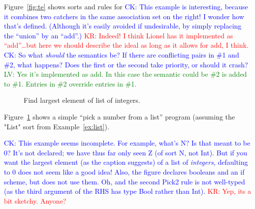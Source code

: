 \documentclass[letterpaper,11pt]{article}
\newcommand{\CK}[1]{\textcolor{blue}{CK: #1}}
\newcommand{\KR}[1]{\textcolor{red}{KR: #1}}
\newcommand{\LV}[1]{\textcolor{green}{LV: #1}}
\begin{document}
\begin{example}\label{ex:te}
  Figure~\ref{fig:te} shows sorts and rules for 
\CK{This example is interesting, because it combines two catchers in
the same association set on the right! I wonder how that's defined.
(Although it's easily avoided if undesirable, by simply replacing the
``union'' by an ``add''.)}
\KR{Indeed! I think Lionel has it implemented as ``add''…but here we should describe the ideal as
  long as it allows for add, I think.}
\CK{So what \emph{should} the semantics be?  If there are conflicting
  pairs in \#1 and \#2, what happens? Does the first or the second take
  priority, or should it crash?}
\LV{Yes it's implemented as add. In this case the semantic could
be \#2 is added to \#1. Entries in \#2 override entries in \#1.}
\end{example}

\begin{figure}[h!t]
  \caption{Find largest element of list of integers.}
  \label{fig:pick}
\end{figure}

\begin{example}[]\label{ex:pick}
  Figure~\ref{fig:pick} shows a simple ``pick a number from a list'' program (assuming the "List"
  sort from Example~\ref{ex:list}).

  \CK{This example seems incomplete.  For example, what's N? Is that meant to
  be 0? It's not declared; we have thus far only seen Z (of sort N, not Int).
  But if you want the largest element (as the caption suggests) of a list of
  \emph{integers}, defaulting to 0 does not seem like a good idea!  Also, the
  figure declares booleans and an if scheme, but does not use them.  Oh, and
  the second Pick2 rule is not well-typed (as the third argument of the RHS
  has type Bool rather than Int).}
  \KR{Yep, its a bit sketchy. Anyone?}
\end{example}
\end{document}
